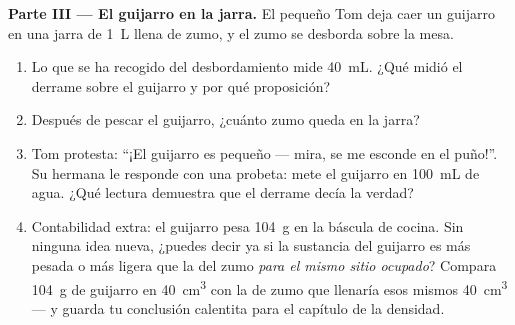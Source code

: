 \begin{problem}
\medskip\noindent\textbf{Parte III --- El guijarro en la jarra.}
El pequeño Tom deja caer un guijarro en una jarra de \qty{1}{L} llena
de zumo, y el zumo se desborda sobre la mesa.
\begin{enumerate}[resume]
  \item Lo que se ha recogido del desbordamiento mide
        \qty{40}{mL}. ¿Qué midió el derrame sobre el guijarro y por
        qué proposición?
  \item Después de pescar el guijarro, ¿cuánto zumo queda en la
        jarra?
  \item Tom protesta: ``¡El guijarro es pequeño --- mira, se me
        esconde en el puño!''. Su hermana le responde con una
        probeta: mete el guijarro en \qty{100}{mL} de agua. ¿Qué
        lectura demuestra que el derrame decía la verdad?
  \item Contabilidad extra: el guijarro pesa \qty{104}{g} en la
        báscula de cocina. Sin ninguna idea nueva, ¿puedes decir ya
        si la sustancia del guijarro es más pesada o más ligera que
        la del zumo \emph{para el mismo sitio ocupado}? Compara
        \qty{104}{g} de guijarro en \qty{40}{cm^3} con la  de
        zumo que llenaría esos mismos \qty{40}{cm^3} --- y guarda tu
        conclusión calentita para el capítulo de la densidad.
\end{enumerate}
\end{problem}
